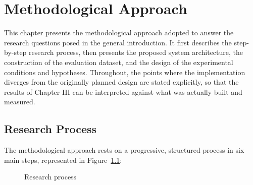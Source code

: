\documentclass[12pt]{report}
\begin{document}
\chapter{Methodological Approach}
This chapter presents the methodological approach adopted to answer the research questions posed in the general introduction. It first describes the step-by-step research process, then presents the proposed system architecture, the construction of the evaluation dataset, and the design of the experimental conditions and hypotheses. Throughout, the points where the implementation diverges from the originally planned design are stated explicitly, so that the results of Chapter III can be interpreted against what was actually built and measured.
\section{Research Process}
The methodological approach rests on a progressive, structured process in six main steps, represented in Figure~\ref{fig:process}:
\begin{figure}[H]
\centering
{}
\caption{Research process}
\label{fig:process}
\end{figure}
\end{document}
